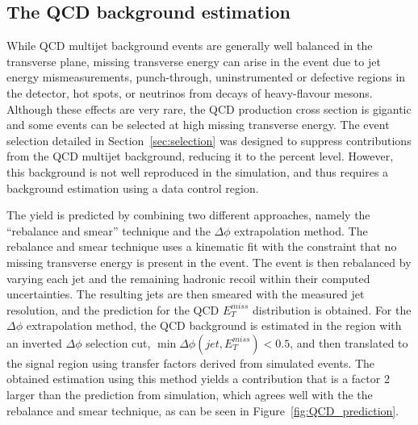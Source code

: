 \subsection{The QCD background estimation}

While QCD multijet background events are generally well balanced in the transverse plane, missing transverse energy can arise in the event due to jet energy mismeasurements, punch-through, uninstrumented or defective regions in the detector, hot spots, or neutrinos from decays of heavy-flavour mesons. Although these effects are very rare, the QCD production cross section is gigantic and some events can be selected at high missing transverse energy. The event selection detailed in Section~\ref{sec:selection} was designed to suppress contributions from the QCD multijet background, reducing it to the percent level. However, this background is not well reproduced in the simulation, and thus requires a background estimation using a data control region.

The yield is predicted by combining two different approaches, namely the ``rebalance and smear'' technique and the $\Delta\phi$ extrapolation method. The rebalance and smear technique uses a kinematic fit with the constraint  that no missing transverse energy is present in the event. The event is then rebalanced by varying each jet and the remaining hadronic recoil within their computed uncertainties. The resulting jets are then smeared with the measured jet resolution, and the prediction for the QCD $E_T^{miss}$ distribution is obtained. For the $\Delta\phi$ extrapolation method, the QCD background is estimated in the region with an inverted $\Delta\phi$ selection cut, $\min\Delta\phi(jet, E_T^{miss}) < 0.5$, and then translated to the signal region using transfer factors derived from simulated events. The obtained estimation using this method yields a contribution that is a factor 2 larger than the prediction from simulation, which agrees well with the the rebalance and smear technique, as can be seen in Figure~\ref{fig:QCD_prediction}.


